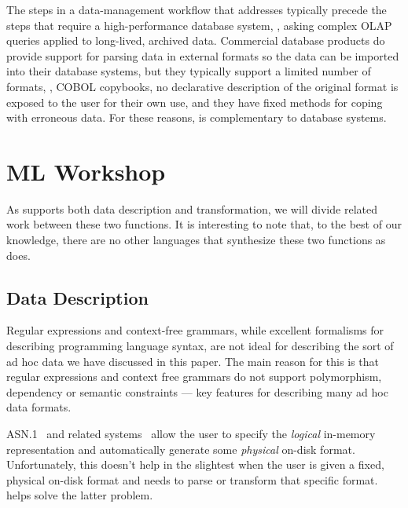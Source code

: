 \documentclass[11pt]{article}
\begin{document}

The steps in a data-management workflow that \padx{} addresses
typically precede the steps that require a high-performance database
system, \eg{}, asking complex OLAP queries applied to long-lived,
archived data.  Commercial database products do provide support for
parsing data in external formats so the data can be imported into
their database systems, but they typically support a limited number of
formats, \eg{}, COBOL copybooks, no declarative description of the
original format is exposed to the user for their own use, and they
have fixed methods for coping with erroneous data.  For these reasons,
\padx{} is complementary to database systems.

\section{ML Workshop}

As \datatype{} supports both data description and transformation, we
will divide related work between these two functions. It is
interesting to note that, to the best of our knowledge, there are no
other languages that synthesize these two functions as \datatype{}
does.

\subsection{Data Description}
Regular
expressions and context-free grammars, while excellent formalisms for
describing programming language syntax, are not ideal for describing
the sort of ad hoc data we have discussed in this paper.  The main
reason for this is that regular expressions and context free grammars
do not support polymorphism, dependency or semantic constraints ---
key features for describing many ad hoc data formats.

ASN.1~\cite{asn} and related systems~\cite{asdl} allow the user to
specify the {\em logical} in-memory representation and
automatically generate some 
{\em physical} on-disk format. 
Unfortunately, this doesn't help in the slightest when the user is
given a fixed, physical on-disk format and needs to parse or transform
that specific format.  \datatype{} helps solve
the latter problem.
\end{document}
